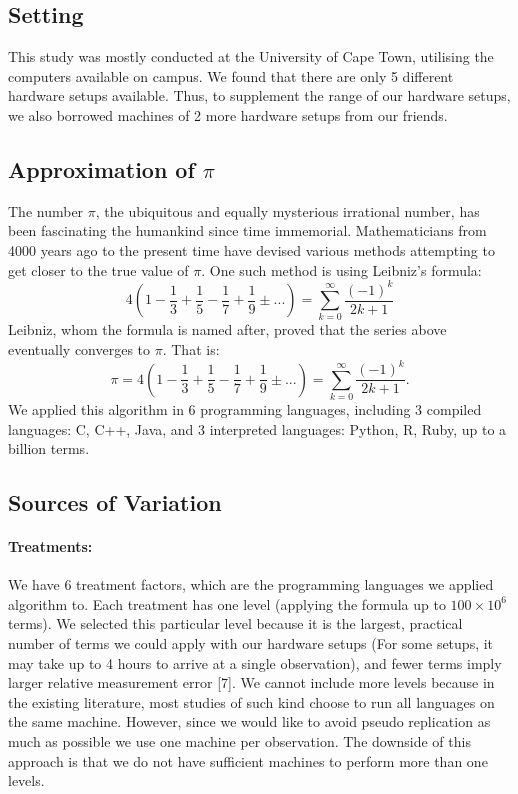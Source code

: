 \documentclass[12pt,halfline,a4paper,]{ouparticle}
\begin{document}
\subsection{Setting}\label{setting}

This study was mostly conducted at the University of Cape Town,
utilising the computers available on campus. We found that there are
only 5 different hardware setups available. Thus, to supplement the
range of our hardware setups, we also borrowed machines of 2 more
hardware setups from our friends.

\subsection{\texorpdfstring{Approximation of
\(\pi\)}{Approximation of \textbackslash pi}}\label{approximation-of-pi}

The number \(\pi\), the ubiquitous and equally mysterious irrational
number, has been fascinating the humankind since time immemorial.
Mathematicians from 4000 years ago to the present time have devised
various methods attempting to get closer to the true value of \(\pi\).
One such method is using Leibniz's formula: \[
4 \left( 1 - \frac{1}{3} + \frac{1}{5} - \frac{1}{7} + \frac{1}{9} ±... \right) = \sum_{k=0}^{\infty}\frac{(-1)^k}{2k+1}
\] Leibniz, whom the formula is named after, proved that the series
above eventually converges to \(\pi\). That is: \[
\pi = 4 \left( 1 - \frac{1}{3} + \frac{1}{5} - \frac{1}{7} + \frac{1}{9} ±... \right) = \sum_{k=0}^{\infty}\frac{(-1)^k}{2k+1}.
\] We applied this algorithm in 6 programming languages, including 3
compiled languages: C, C++, Java, and 3 interpreted languages: Python,
R, Ruby, up to a billion terms.

\subsection{Sources of Variation}\label{sources-of-variation}

\paragraph{Treatments:}\label{treatments}

We have 6 treatment factors, which are the programming languages we
applied algorithm to. Each treatment has one level (applying the formula
up to \(100 \times 10^6\) terms). We selected this particular level
because it is the largest, practical number of terms we could apply with
our hardware setups (For some setups, it may take up to 4 hours to
arrive at a single observation), and fewer terms imply larger relative
measurement error {[}7{]}. We cannot include more levels because in the
existing literature, most studies of such kind choose to run all
languages on the same machine. However, since we would like to avoid
pseudo replication as much as possible we use one machine per
observation. The downside of this approach is that we do not have
sufficient machines to perform more than one levels.
\end{document}
